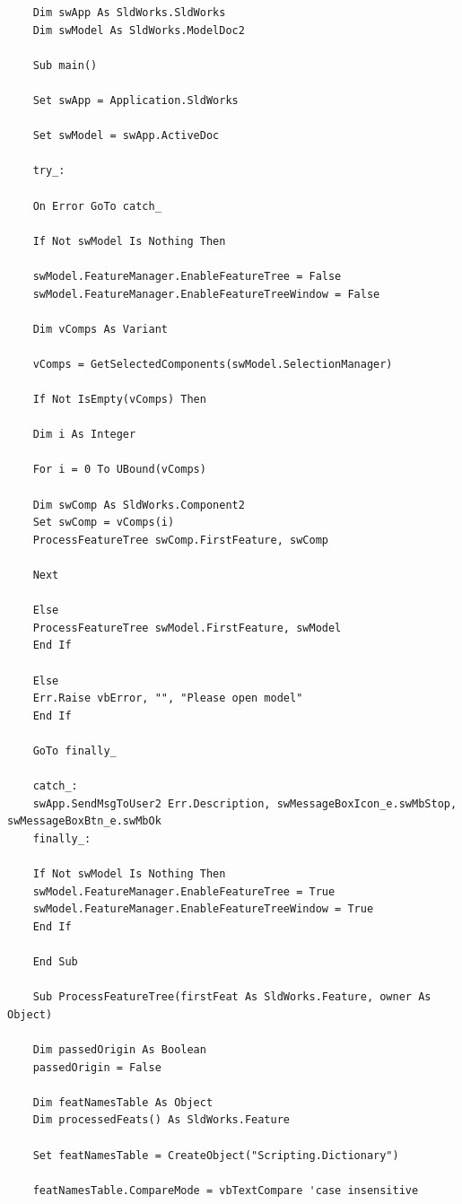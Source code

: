 \documentclass{report}
\begin{document}


\begin{lstlisting}
	Dim swApp As SldWorks.SldWorks
	Dim swModel As SldWorks.ModelDoc2
	
	Sub main()
	
	Set swApp = Application.SldWorks
	
	Set swModel = swApp.ActiveDoc
	
	try_:
	
	On Error GoTo catch_
	
	If Not swModel Is Nothing Then
	
	swModel.FeatureManager.EnableFeatureTree = False
	swModel.FeatureManager.EnableFeatureTreeWindow = False
	
	Dim vComps As Variant
	
	vComps = GetSelectedComponents(swModel.SelectionManager)
	
	If Not IsEmpty(vComps) Then
	
	Dim i As Integer
	
	For i = 0 To UBound(vComps)
	
	Dim swComp As SldWorks.Component2
	Set swComp = vComps(i)
	ProcessFeatureTree swComp.FirstFeature, swComp
	
	Next
	
	Else
	ProcessFeatureTree swModel.FirstFeature, swModel
	End If
	
	Else
	Err.Raise vbError, "", "Please open model"
	End If
	
	GoTo finally_
	
	catch_:
	swApp.SendMsgToUser2 Err.Description, swMessageBoxIcon_e.swMbStop, swMessageBoxBtn_e.swMbOk
	finally_:
	
	If Not swModel Is Nothing Then
	swModel.FeatureManager.EnableFeatureTree = True
	swModel.FeatureManager.EnableFeatureTreeWindow = True
	End If
	
	End Sub
	
	Sub ProcessFeatureTree(firstFeat As SldWorks.Feature, owner As Object)
	
	Dim passedOrigin As Boolean
	passedOrigin = False
	
	Dim featNamesTable As Object
	Dim processedFeats() As SldWorks.Feature
	
	Set featNamesTable = CreateObject("Scripting.Dictionary")
	
	featNamesTable.CompareMode = vbTextCompare 'case insensitive
	

\end{lstlisting}
\end{document}
